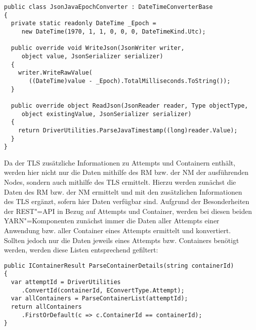 \begin{lstlisting}[label=lst:javaEpochConverter,style=cs,
caption={[Entwickelter Konverter für Java"=Zeitstempel zur Nutzung mit Json.NET]
    Entwickelter Konverter für Java"=Zeitstempel zur Nutzung mit Json.NET.
    Dieser erbt dafür von \texttt{DateTimeConverterBase} des Json.NET"=Frameworks, damit der \texttt{JsonJavaEpochConverter} auch zur Konvertierung genutzt werden kann.}]
public class JsonJavaEpochConverter : DateTimeConverterBase
{
  private static readonly DateTime _Epoch =
     new DateTime(1970, 1, 1, 0, 0, 0, DateTimeKind.Utc);

  public override void WriteJson(JsonWriter writer,
     object value, JsonSerializer serializer)
  {
    writer.WriteRawValue(
       ((DateTime)value - _Epoch).TotalMilliseconds.ToString());
  }
  
  public override object ReadJson(JsonReader reader, Type objectType,
     object existingValue, JsonSerializer serializer)
  {
    return DriverUtilities.ParseJavaTimestamp((long)reader.Value);
  }
}
\end{lstlisting}

Da der \gls{TLS} zusätzliche Informationen zu Attempts und Containern enthält, werden hier nicht nur die Daten mithilfe des \gls{RM} bzw. der \gls{NM} der ausführenden Nodes, sondern auch mithilfe des \gls{TLS} ermittelt.
Hierzu werden zunächst die Daten des \gls{RM} bzw. der \gls{NM} ermittelt und mit den zusätzlichen Informationen des \gls{TLS} ergänzt, sofern hier Daten verfügbar sind.
Aufgrund der Besonderheiten der REST"=API in Bezug auf Attempts und Container, werden bei diesen beiden YARN"=Komponenten zunächst immer die Daten aller Attempts einer Anwendung bzw. aller Container eines Attempts ermittelt und konvertiert.
Sollten jedoch nur die Daten jeweils eines Attempts bzw. Containers benötigt werden, werden diese Listen entsprechend gefiltert:

\begin{lstlisting}[label=lst:restParseDetails,style=cs,
caption={[Konvertierung und Rückgabe eines Containers durch den RestParser]
    Konvertierung und Rückgabe eines Containers durch den \texttt{RestParser}.
    Hierbei muss für den hier gezeigten, einzelnen Container zunächst die ID des übergeordneten Attempts ermittelt werden, bevor aus der Liste aller Container die Daten des gesuchten Containers zurückgegeben werden können.
    Bei Attempts ist dieses Vorgehen analog.}]
public IContainerResult ParseContainerDetails(string containerId)
{
  var attemptId = DriverUtilities
     .ConvertId(containerId, EConvertType.Attempt);
  var allContainers = ParseContainerList(attemptId);
  return allContainers
     .FirstOrDefault(c => c.ContainerId == containerId);
}
\end{lstlisting}

